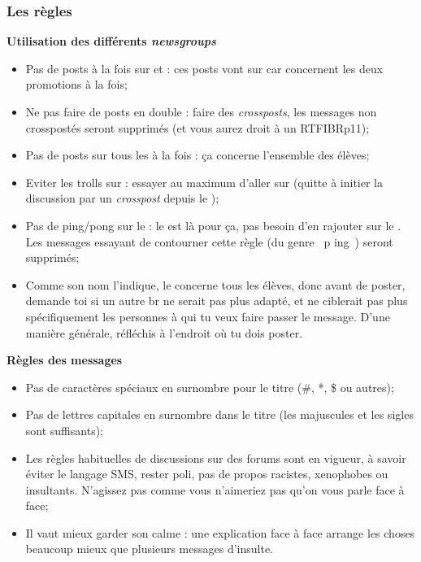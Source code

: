 \subsubsection{Les r\`egles}
\textbf{Utilisation des diff\'erents \emph{newsgroups}}
\begin{itemize}

 \item Pas de posts \`a  la fois sur  et  : ces posts vont sur  car concernent les deux promotions \`a  la fois;
 \item Ne pas faire de posts en double : faire des \emph{crossposts}, les messages non crosspost\'es seront supprim\'es (et vous aurez droit \`a  un RTFIBRp11);
 \item Pas de posts sur tous les  \`a  la fois : \c ca concerne l'ensemble des \'el\`eves;
 \item Eviter les trolls sur  : essayer au maximum d'aller sur  (quitte \`a  initier la discussion par un \emph{crosspost} depuis le );
 \item Pas de ping/pong sur le  : le  est l\`a  pour \c ca, pas besoin d'en rajouter sur le . Les messages essayant de contourner cette r\`egle (du genre \guillemotleft{}~p ing~\guillemotright{}) seront supprim\'es;
 \item Comme son nom l'indique, le  concerne tous les \'el\`eves, donc avant de poster, demande toi si un autre br ne serait pas plus adapt\'e, et ne ciblerait pas plus sp\'ecifiquement les personnes \`a  qui tu veux faire passer le message. D'une mani\`ere g\'en\'erale, r\'efl\'echis \`a  l'endroit o\`u tu dois poster.

\end{itemize}

\textbf{R\`egles des messages}
\begin{itemize}
 \item Pas de caract\`eres sp\'eciaux en surnombre pour le titre (\#, *, \$ ou autres);
 \item Pas de lettres capitales en surnombre dans le titre (les majuscules et les sigles sont suffisants);
 \item Les r\`egles habituelles de discussions sur des forums sont en vigueur, \`a  savoir \'eviter le langage SMS, rester poli, pas de propos racistes, xenophobes ou insultants. N'agissez pas comme vous n'aimeriez pas qu'on vous parle face \`a  face;
 \item Il vaut mieux garder son calme : une explication face \`a  face arrange les choses beaucoup mieux que plusieurs messages d'insulte.
\end{itemize}


